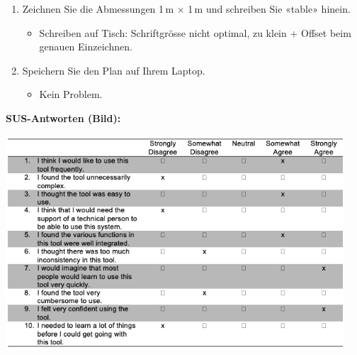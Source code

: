 \begin{enumerate}
    \item Zeichnen Sie die Abmessungen 1\,m $\times$ 1\,m und schreiben Sie «table» hinein.
    \begin{itemize}
        \item Schreiben auf Tisch: Schriftgrösse nicht optimal, zu klein + Offset beim genauen Einzeichnen.
    \end{itemize}

    \item Speichern Sie den Plan auf Ihrem Laptop.
    \begin{itemize}
        \item Kein Problem.
    \end{itemize}
\end{enumerate}

\clearpage

\textbf{SUS-Antworten (Bild):}
\begin{center}
    \includegraphics[width=0.95\textwidth]{graphics/sus_person5.png}
\end{center}

